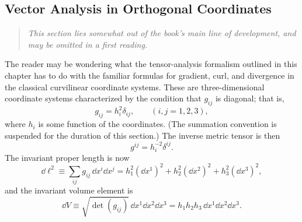 
\subsection{Vector Analysis in Orthogonal Coordinates\optionalreading}
\label{sec:4.8}

\begin{quote}
\small\itshape
This section lies somewhat out of the book's main line of development, and
may be omitted in a first reading.
\end{quote}

The reader may be wondering what the tensor-analysis formalism outlined in
this chapter has to do with the familiar formulas for gradient, curl, and
divergence in the classical curvilinear coordinate systems. These are
three-dimensional coordinate systems characterized by the condition that
\(g_{ij}\) is diagonal; that is,
\begin{equation}
  g_{ij}=h_i^2\delta_{ij},
  \qquad (i,j=1,2,3),
  \tag{4.8.1}\label{eq:4.8.1}
\end{equation}
where \(h_i\) is some function of the coordinates. (The summation convention
is suspended for the duration of this section.) The inverse metric tensor is
then
\begin{equation}
  g^{ij}=h_i^{-2}\delta^{ij}.
  \tag{4.8.2}\label{eq:4.8.2}
\end{equation}
The invariant proper length is now
\begin{equation}
  \dd\ell^2
  \equiv
  \sum_{ij}g_{ij}\,\dd x^i\dd x^j
  =
  h_1^2(\dd x^1)^2+h_2^2(\dd x^2)^2+h_3^2(\dd x^3)^2,
  \tag{4.8.3}\label{eq:4.8.3}
\end{equation}
and the invariant volume element is
\begin{equation}
  \dd V
  \equiv
  \sqrt{\det(g_{ij})}\,\dd x^1\dd x^2\dd x^3
  =
  h_1h_2h_3\,\dd x^1\dd x^2\dd x^3.
  \tag{4.8.4}\label{eq:4.8.4}
\end{equation}

